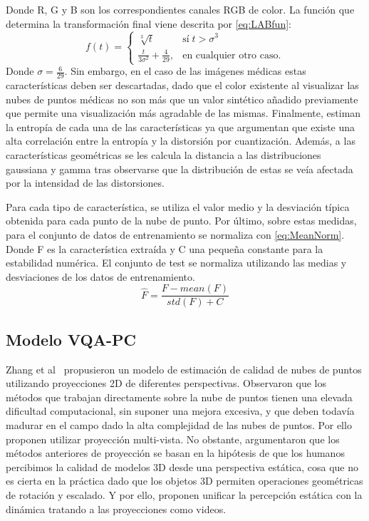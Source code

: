 Donde R, G y B son los correspondientes canales RGB de color. La función que 
determina la transformación final viene descrita por \eqref{eq:LABfun}: 
\begin{equation}
  f(t) = \begin{cases} \sqrt[3]{t} & \textrm{sí}\; t > \sigma^3 \\ 
    \frac{t}{3\sigma^2} + \frac{4}{29},& \textrm{en cualquier otro caso.}
         \end{cases}  
  \label{eq:LABfun}
\end{equation}
Donde $\sigma = \frac{6}{29}$.
Sin embargo, en el caso de las imágenes médicas estas características deben 
ser descartadas, dado que el color existente al visualizar las nubes de puntos 
médicas no son más que un valor sintético añadido previamente que permite 
una visualización más agradable de las mismas. 
Finalmente, estiman la entropía de cada una de las características 
ya que argumentan que existe una alta correlación entre la 
entropía y la distorsión por cuantización. 
Además, a las características geométricas se les calcula 
la distancia a las distribuciones gaussiana y gamma tras observarse 
que la distribución de estas se veía afectada por la intensidad 
de las distorsiones. 

Para cada tipo de característica, se utiliza el valor medio y la desviación típica 
obtenida para cada punto de la nube de punto. Por último, sobre estas medidas, 
para el conjunto de datos de entrenamiento se normaliza con \eqref{eq:MeanNorm}.
Donde F es la característica extraída y C una pequeña constante para la 
estabilidad numérica. El conjunto de test se normaliza utilizando las medias y 
desviaciones de los datos de entrenamiento.
\begin{equation} 
  \hat F = \frac{F-mean(F)}{std(F) + C}
  \label{eq:MeanNorm}
\end{equation}


\subsection{Modelo VQA-PC}
Zhang et al~\cite{VQA-PC} propusieron un modelo de estimación de calidad de nubes 
de puntos utilizando proyecciones 2D de diferentes perspectivas. 
Observaron que los métodos que trabajan directamente sobre la nube de puntos tienen
una elevada dificultad computacional, sin suponer una mejora excesiva, y que 
deben todavía madurar en el campo dado la alta complejidad de las nubes de puntos.
Por ello proponen utilizar proyección multi-vista. No obstante, argumentaron que 
los métodos anteriores de proyección se basan en la hipótesis de que los humanos 
percibimos la calidad de modelos 3D desde una perspectiva estática, cosa que no 
es cierta en la práctica dado que los objetos 3D permiten operaciones geométricas 
de rotación y escalado.
Y por ello, proponen unificar la percepción estática con la dinámica tratando 
a las proyecciones como videos.

